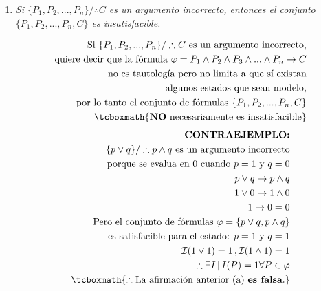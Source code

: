 \documentclass[11pt,letterpaper]{article}
\begin{document}
\begin{enumerate}
            \begin{enumerate}
                \item \textit{Si $\{P_1,P_2,...,P_n\}/\therefore C$ es un argumento
                incorrecto, entonces el conjunto $\{P_1,P_2,...,P_n,C\}$ es insatisfacible.}

                    \begin{equation*} \begin{split}
                        \text{Si } \{P_1,P_2,...,P_n\}/\therefore C \text{ es un argumento incorrecto,} \\
                        \text{quiere decir que la fórmula } \varphi = P_1 \land P_2 \land P_3 \land ... \land P_n \rightarrow C \\
                        \text{no es tautología pero no limita a que sí existan} \\
                        \text{algunos estados que sean modelo,} \\
                        \text{por lo tanto el conjunto de fórmulas } \{P_1,P_2,...,P_n,C\} \\
                        \tcboxmath{\text{\textbf{NO} necesariamente es insatisfacible}}
                    \end{split} \end{equation*}
                    \bigskip
                    \begin{equation*} \begin{split}
                        \text{\textbf{CONTRAEJEMPLO:}} \\
                         \{p \lor q\} / \therefore p \land q \text{ es un argumento incorrecto} \\
                        \text{ porque se evalua en 0 cuando } p = 1 \text{ y } q = 0\\
                        p \lor q \rightarrow p \land q \\
                        1 \lor 0 \rightarrow 1 \land 0 \\
                        1 \rightarrow 0 = 0 \\
                        \text{Pero el conjunto de fórmulas } \varphi = \{ p \lor q , p \land q \} \\
                        \text{es satisfacible para el estado: } p = 1 \text{ y } q = 1\\
                        \mathcal{I}(1 \lor 1) = 1 \, , \mathcal{I}(1 \land 1) = 1 \\
                        \therefore \exists I \, | \, I(P) = 1 \forall P \in \varphi \\
                        \tcboxmath{\therefore \text{La afirmación anterior (a) \textbf{es falsa}.}} \\
                    \end{split} \end{equation*}


\end{enumerate}
\end{enumerate}
\end{document}
